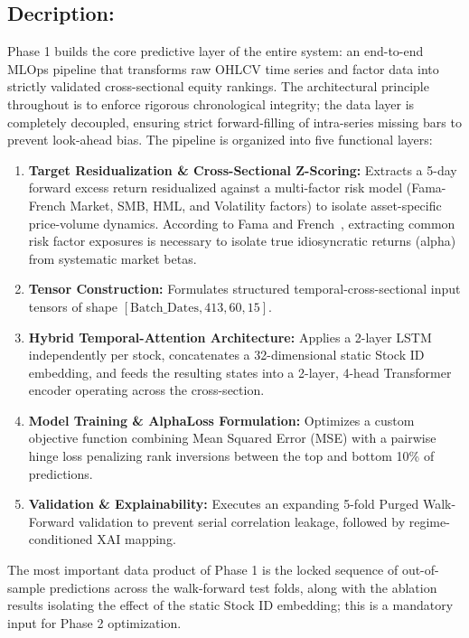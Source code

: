 \subsection*{Decription:}
Phase 1 builds the core predictive layer of the entire system: an end-to-end MLOps pipeline that transforms raw OHLCV time series and factor data into strictly validated cross-sectional equity rankings. The architectural principle throughout is to enforce rigorous chronological integrity; the data layer is completely decoupled, ensuring strict forward-filling of intra-series missing bars to prevent look-ahead bias. The pipeline is organized into five functional layers:
\begin{enumerate}
    \item \textbf{Target Residualization \& Cross-Sectional Z-Scoring:} Extracts a 5-day forward excess return residualized against a multi-factor risk model (Fama-French Market, SMB, HML, and Volatility factors) to isolate asset-specific price-volume dynamics. According to Fama and French~\cite{FamaFrench1993}, extracting common risk factor exposures is necessary to isolate true idiosyncratic returns (alpha) from systematic market betas.
    \item \textbf{Tensor Construction:} Formulates structured temporal-cross-sectional input tensors of shape $[\text{Batch\_Dates}, 413, 60, 15]$.
    \item \textbf{Hybrid Temporal-Attention Architecture:} Applies a 2-layer LSTM independently per stock, concatenates a 32-dimensional static Stock ID embedding, and feeds the resulting states into a 2-layer, 4-head Transformer encoder operating across the cross-section.
    \item \textbf{Model Training \& AlphaLoss Formulation:} Optimizes a custom objective function combining Mean Squared Error (MSE) with a pairwise hinge loss penalizing rank inversions between the top and bottom 10\% of predictions.
    \item \textbf{Validation \& Explainability:} Executes an expanding 5-fold Purged Walk-Forward validation to prevent serial correlation leakage, followed by regime-conditioned \ac{XAI} mapping.
\end{enumerate}

The most important data product of Phase 1 is the locked sequence of out-of-sample predictions across the walk-forward test folds, along with the ablation results isolating the effect of the static Stock ID embedding; this is a mandatory input for Phase 2 optimization.

